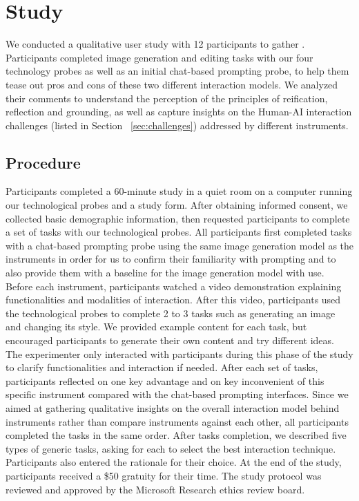\section{Study}

We conducted a qualitative user study with 12 participants to gather . Participants completed image generation and editing tasks with our four technology probes as well as an initial chat-based prompting probe, to help them tease out pros and cons of these two different interaction models. We analyzed their comments to understand the perception of the principles of reification, reflection and grounding, as well as capture insights on the Human-AI interaction challenges (listed in Section ~\ref{sec:challenges}) addressed by different instruments.

\subsection{Procedure}
Participants completed a 60-minute study in a quiet room on a computer running our technological probes and a study form. After obtaining informed consent, we collected basic demographic information, then requested participants to complete a set of tasks with our technological probes. All participants first completed tasks with a chat-based prompting probe using the same image generation model as the instruments in order for us to confirm their familiarity with prompting and to also provide them with a baseline for the image generation model with use. Before each instrument, participants watched a video demonstration explaining functionalities and modalities of interaction. After this video, participants used the technological probes to complete 2 to 3 tasks such as generating an image and changing its style. We provided example content for each task, but encouraged participants to generate their own content and try different ideas. The experimenter only interacted with participants during this phase of the study to clarify functionalities and interaction if needed. After each set of tasks, participants reflected on one key advantage and on key inconvenient of this specific instrument compared with the chat-based prompting interfaces. Since we aimed at gathering qualitative insights on the overall interaction model behind instruments rather than compare instruments against each other, all participants completed the tasks in the same order. After tasks completion, we described five types of generic tasks, asking for each to select the best interaction technique. Participants also entered the rationale for their choice. At the end of the study, participants received a \$50 gratuity for their time. The study protocol was reviewed and approved by the Microsoft Research ethics review board.

